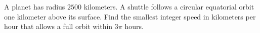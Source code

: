 A planet has radius $2500$ kilometers. A shuttle follows a circular equatorial orbit one kilometer above its surface. Find the smallest integer speed in kilometers per hour that allows a full orbit within $3\pi$ hours.
